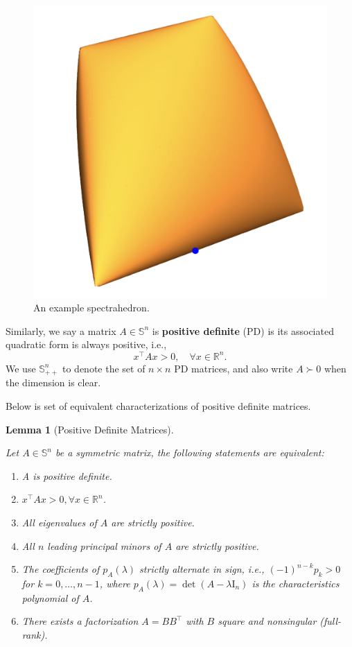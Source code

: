 \documentclass[
]{book}
\newtheorem{lemma}{Lemma}[chapter]
\theoremstyle{definition}
\theoremstyle{definition}
\theoremstyle{definition}
\theoremstyle{definition}
\theoremstyle{remark}
\begin{document}
\begin{figure}

{\centering \includegraphics[width=0.5\linewidth]{images/spectrahedron-stride} 

}

\caption{An example spectrahedron.}\label{fig:SpectrahedronStride}
\end{figure}

Similarly, we say a matrix \(A \in \mathbb{S}^{n}\) is \textbf{positive definite} (PD) is its associated quadratic form is always positive, i.e.,
\[
x^\top A x > 0, \quad \forall x \in \mathbb{R}^{n}.
\]
We use \(\mathbb{S}^{n}_{++}\) to denote the set of \(n \times n\) PD matrices, and also write \(A \succ 0\) when the dimension is clear.

Below is set of equivalent characterizations of positive definite matrices.

\begin{lemma}[Positive Definite Matrices]
\protect\hypertarget{lem:PositiveDefinite}{}\label{lem:PositiveDefinite}

Let \(A \in \mathbb{S}^{n}\) be a symmetric matrix, the following statements are equivalent:

\begin{enumerate}
\def\labelenumi{\arabic{enumi}.}
\item
  A is positive definite.
\item
  \(x^\top A x > 0, \forall x \in \mathbb{R}^{n}\).
\item
  All eigenvalues of \(A\) are strictly positive.
\item
  All \(n\) leading principal minors of \(A\) are strictly positive.
\item
  The coefficients of \(p_A(\lambda)\) strictly alternate in sign, i.e., \((-1)^{n-k} p_k > 0\) for \(k=0,\dots,n-1\), where \(p_A(\lambda) = \det (A - \lambda \mathrm{I}_n)\) is the characteristics polynomial of \(A\).
\item
  There exists a factorization \(A = BB^\top\) with \(B\) square and nonsingular (full-rank).
\end{enumerate}

\end{lemma}
\end{document}
